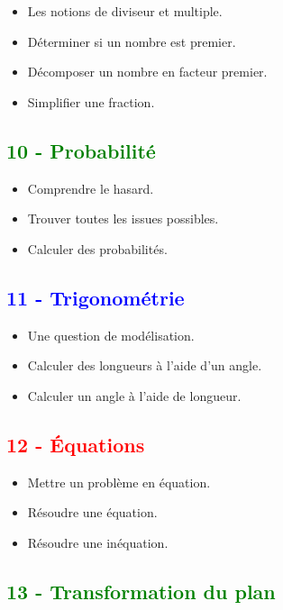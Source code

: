 \documentclass[11pt]{article}
\begin{document}
\begin{multicols}{2}
\begin{itemize}
\item Les notions de diviseur et multiple.
\item Déterminer si un nombre est premier.
\item Décomposer un nombre en facteur premier.
\item Simplifier une fraction.
\end{itemize}

\subsection*{\textcolor{green}{10 - Probabilité}}

\begin{itemize}
\item Comprendre le hasard.
\item Trouver toutes les issues possibles.
\item Calculer des probabilités.
\end{itemize}



\subsection*{\textcolor{blue}{11 - Trigonométrie}}

\begin{itemize}
\item Une question de modélisation.
\item Calculer des longueurs à l'aide d'un angle.
\item Calculer un angle à l'aide de longueur.
\end{itemize}

\subsection*{\textcolor{red}{12 - Équations}}

\begin{itemize}
\item Mettre un problème en équation.
\item Résoudre une équation.
\item Résoudre une inéquation.
\end{itemize}

\subsection*{\textcolor{green}{13 - Transformation du plan}}


\end{multicols}
\end{document}
